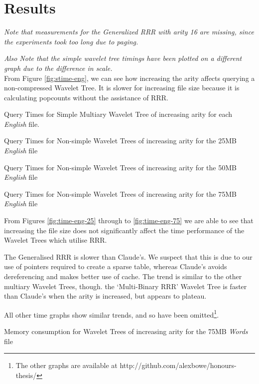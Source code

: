 \section{Results}
\emph{Note that measurements for the Generalized RRR with arity 16 are missing, since the experiments took too long due to paging.}

\emph{Also Note that the simple wavelet tree timings have been plotted on a different graph 
due to the difference in scale.}\\

From Figure \ref{fig:stime-eng}, we can see how increasing the arity affects
querying a non-compressed Wavelet Tree. It is slower for increasing file size
because it is calculating popcounts without the assistance of RRR.


			{Query Times for Simple Multiary Wavelet Tree of increasing arity
			for each \emph{English} file.}
		
			{Query Times for Non-simple Wavelet Trees of increasing arity
			for the 25MB \emph{English} file}
		
			{Query Times for Non-simple Wavelet Trees of increasing arity
			for the 50MB \emph{English} file}
		
			{Query Times for Non-simple Wavelet Trees of increasing arity
			for the 75MB \emph{English} file}

From Figures \ref{fig:time-eng-25} through to \ref{fig:time-eng-75} we are able 
to see that increasing the file size does not significantly affect the time
performance of the Wavelet Trees which utilise RRR.

The Generalised RRR is slower than Claude's. We suspect that this is due to our 
use of pointers required to create a sparse table, whereas Claude's avoids 
dereferencing and makes better use of cache. The trend is similar to the
other multiary Wavelet Trees, though. the `Multi-Binary RRR' Wavelet Tree
is faster than Claude's when the arity is increased, but appears to plateau.

All other time graphs show similar trends, and so have been omitted\footnote{The 
other graphs are available at http://github.com/alexbowe/honours-thesis/}.

			{Memory consumption for Wavelet Trees of increasing arity for
			the 75MB \emph{Words} file}

